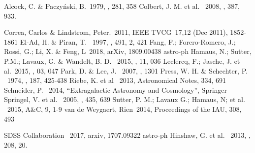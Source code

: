 \documentclass[preprint]{aastex62}
\begin{document}
  \nocite{*}

  \begin{thebibliography}{}
    
     Alcock, C. \& Paczy\'nski, B.\ 1979, \nat, 281, 358    
     Colbert, J. M. et al. \ 2008, \mnras, 387, 933. %
      
     Correa, Carlos \& Lindstrom, Peter.\ 2011,  IEEE TVCG\ 17,12 (Dec 2011), 1852-1861
     El-Ad, H. \& Piran, T. \ 1997, \apj, 491, 2, 421
     Fang, F.; Forero-Romero, J.; Rossi, G.; Li, X. \& Feng, L\ 2018, arXiv, 1809.00438 astro-ph
     Hamaus, N.; Sutter, P.M.; Lavaux, G. \& Wandelt, B. D. \ 2015, \jcap, 11, 036    
     Leclercq, F.; Jasche, J. et al.\ 2015, \jcap, 03, 047
     Park, D. \& Lee, J. \ 2007, , 1301 %
     Press, W. H. \& Schechter, P. \ 1974, \apj, 187, 425-438
     Riebe, K. et al \ 2013, Astronomical Notes, 334, 691 %
     Schneider, P. \ 2014, ``Extragalactic Astronomy and Cosmology'', Springer
     Springel, V. et al. \ 2005, \nat, 435, 639 %
     Sutter, P. M.; Lavaux G.; Hamaus, N; et al. \ 2015, A\&C, 9, 1-9 %
     van de Weygaert, Rien\ 2014, Proceedings of the IAU, 308, 493 %

     SDSS Collaboration \ 2017, arxiv, 1707.09322 astro-ph %
     Hinshaw, G. et al. \ 2013, \apjs, 208, 20. %
  \end{thebibliography}                                                           
                       

\end{document}
